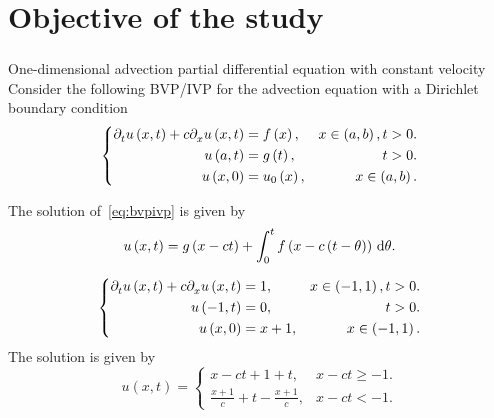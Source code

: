 \section{Objective of the study}

\begin{frame}
	\frametitle{\secname}
	\begin{block}{One-dimensional advection partial differential equation with constant velocity}
		Consider the following BVP/IVP for the advection equation
		with a Dirichlet boundary condition
		\begin{equation}\label{eq:bvpivp}
			\left\{
			\begin{aligned}
				\difcp{u}{t}\left(x,t\right)+
				c
				\difcp{u}{x}\left(x,t\right) & =
				f\left(x\right),             & x\in\left(a,b\right), t>0. \\
				u\left(a,t\right)            & =
				g\left(t\right),             & t>0.                       \\
				u\left(x,0\right)            & =
				u_{0}\left(x\right),         & x\in\left(a,b\right).
			\end{aligned}
			\right.
		\end{equation}

		The solution of~\eqref{eq:bvpivp} is given by
		\begin{equation*}
			u\left(x,t\right)=
			g\left(x-ct\right)+
			\int_{0}^{t}
			f\left(x-c\left(t-\theta\right)\right)\dl\theta. %
		\end{equation*}
	\end{block}

	\begin{example}
		\begin{equation*}
			\left\{
			\begin{aligned}
				\difcp{u}{t}\left(x,t\right)+
				c
				\difcp{u}{x}\left(x,t\right) & =
				1,                           & x\in\left(-1,1\right), t>0. \\
				u\left(-1,t\right)           & =
				0,                           & t>0.                        \\
				u\left(x,0\right)            & =
				x+1,                         & x\in\left(-1,1\right).
			\end{aligned}
			\right.
		\end{equation*}
		The solution is given by
		\begin{equation*}
			u\left(x,t\right)=
			\begin{cases}
				x-ct + 1 + t,                  & x-ct\geq -1. \\
				\frac{x+1}{c}+t-\frac{x+1}{c}, & x-ct<-1.
			\end{cases}
		\end{equation*}
	\end{example}
\end{frame}
